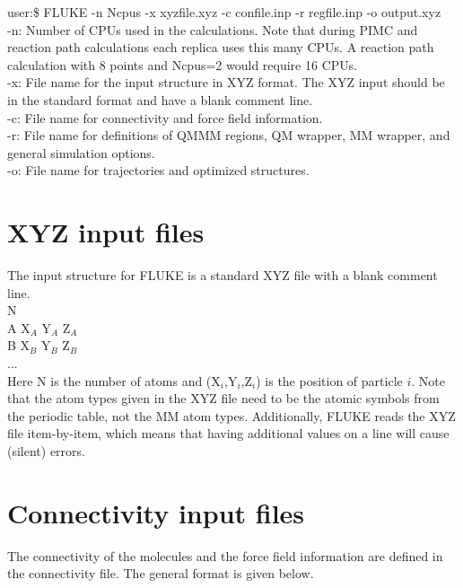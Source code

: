 \documentclass[12pt]{report}
\begin{document}
user:\$ FLUKE -n Ncpus -x xyzfile.xyz -c confile.inp
 -r regfile.inp -o output.xyz \\

-n: Number of CPUs used in the calculations. Note that during PIMC and
reaction path calculations each replica uses this many CPUs. A reaction
path calculation with 8 points and Ncpus=2 would require 16 CPUs. \\

-x: File name for the input structure in XYZ format. The XYZ input should be
in the standard format and have a blank comment line. \\

-c: File name for connectivity and force field information. \\

-r: File name for definitions of QMMM regions, QM wrapper, MM wrapper,
and general simulation options. \\

-o: File name for trajectories and optimized structures. \\

\section{XYZ input files}

The input structure for FLUKE is a standard XYZ file with a blank comment
line. \\

N \\

A  X$_A$  Y$_A$  Z$_A$ \\
B  X$_B$  Y$_B$  Z$_B$ \\
... \\

Here N is the number of atoms and (X$_i$,Y$_i$,Z$_i$) is the position of
particle $i$. Note that the atom types given in the XYZ file need to be the
atomic symbols from the periodic table, not the MM atom types. Additionally,
FLUKE reads the XYZ file item-by-item, which means that having additional
values on a line will cause (silent) errors.

\section{Connectivity input files}

The connectivity of the molecules and the force field information are defined
in the connectivity file. The general format is given below. \\
\end{document}
